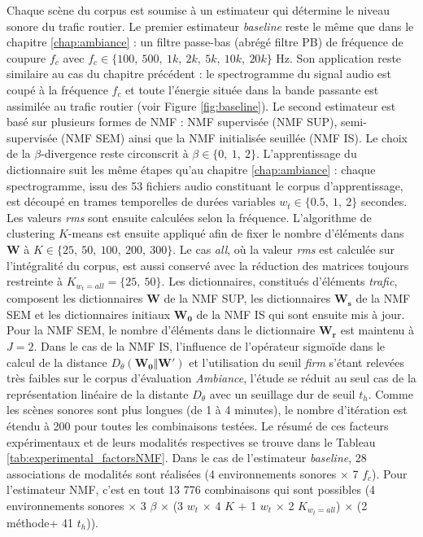 Chaque scène du corpus est soumise à un estimateur qui détermine le niveau sonore du trafic routier. 
Le premier estimateur \textit{baseline} reste le même que dans le chapitre \ref{chap:ambiance} : un filtre passe-bas (abrégé filtre PB) de fréquence de coupure $f_c$ avec $f_c \in \lbrace 100,~500,~1k,~2k,~5k,~10k,~20k \rbrace$ Hz. Son application reste similaire au cas du chapitre précédent : le spectrogramme du signal audio est coupé à la fréquence $f_c$ et toute l'énergie située dans la bande passante est assimilée au trafic routier (voir Figure \ref{fig:baseline}).
Le second estimateur est basé sur plusieurs formes de NMF : NMF supervisée (NMF SUP), semi-supervisée (NMF SEM) ainsi que la NMF initialisée seuillée (NMF IS). Le choix de la $\beta$-divergence reste circonscrit à $\beta \in \lbrace 0,~1,~2 \rbrace$.
L'apprentissage du dictionnaire suit les même étapes qu'au chapitre \ref{chap:ambiance} : chaque spectrogramme, issu des 53 fichiers audio constituant le corpus d'apprentissage, est découpé en trames temporelles de durées variables $w_t \in \lbrace 0.5,~1,~2 \rbrace$ secondes. Les valeurs \textit{rms} sont ensuite calculées selon la fréquence. L'algorithme de clustering $K$-means est ensuite appliqué afin de fixer le nombre d'éléments dans $\mathbf{W}$ à $K \in \lbrace 25,~50,~100,~200,~ 300 \rbrace$. Le cas \textit{all}, où la valeur \textit{rms} est calculée sur l'intégralité du corpus, est aussi conservé avec la réduction des matrices toujours restreinte à $K_{w_t = all} = \lbrace 25,~50 \rbrace$. Les dictionnaires, constitués d'éléments \textit{trafic}, composent les dictionnaires $\mathbf{W}$ de la NMF SUP, les dictionnaires $\mathbf{W_s}$ de la NMF SEM et les dictionnaires initiaux $\mathbf{W_0}$ de la NMF IS qui sont ensuite mis à jour.
Pour la NMF SEM, le nombre d'éléments dans le dictionnaire $\mathbf{W_r}$ est maintenu à $J = 2$.
Dans le cas de la NMF IS, l'influence de l'opérateur sigmoïde dans le calcul de la distance $D_{\theta}(\mathbf{W_0}\Vert \mathbf{W'})$ et l'utilisation du seuil \textit{firm} s'étant relevées très faibles sur le corpus d'évaluation \textit{Ambiance}, l'étude se réduit au seul cas de la représentation linéaire de la distante $D_{\theta}$ avec un seuillage dur de seuil $t_h$.
Comme les scènes sonores sont plus longues (de 1 à 4 minutes), le nombre d'itération est étendu à 200 pour toutes les combinaisons testées. 
Le résumé de ces facteurs expérimentaux et de leurs modalités respectives se trouve dans le Tableau \ref{tab:experimental_factorsNMF}. Dans le cas de l'estimateur \textit{baseline}, 28 associations de modalités sont réalisées (4 environnements sonores $\times$ 7 $f_c$). Pour l'estimateur NMF, c'est en tout 13 776 combinaisons qui sont possibles (4 environnements sonores $\times$ 3 $\beta$ $\times$ (3 $w_t$ $\times$ 4 $K$ + 1 $w_t$ $\times$ 2 $K_{w_t = all}$) $\times$ (2 méthode+ 41 $t_h$)).


